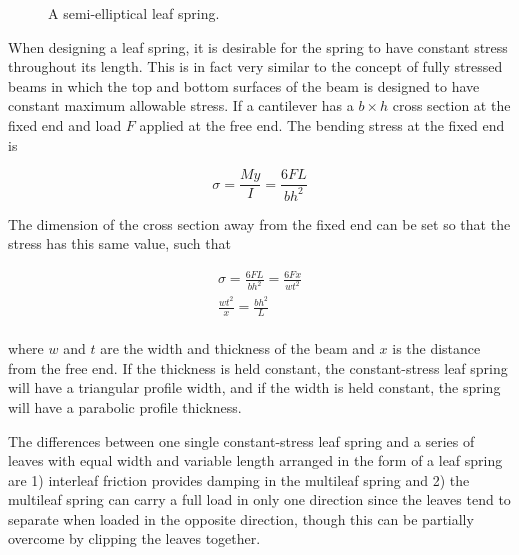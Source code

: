 \documentclass[a4paper,openany,nobib]{tufte-book}
\begin{document}
{{\begin{figure}[h]
  \centering
  \caption{A semi-elliptical leaf spring.}
  \label{fig: leaf springs}
\end{figure}

When designing a leaf spring, it is desirable for the spring to have
constant stress throughout its length. This is in fact very similar to
the concept of fully stressed beams in which the top and bottom surfaces
of the beam is designed to have constant maximum allowable stress. If a
cantilever has a \(b \times h\) cross section at the fixed end and load
\(F\) applied at the free end. The bending stress at the fixed end is

$$\sigma  = \frac{My}{I} = \frac{6FL}{bh^2}$$

The dimension of the cross section away from the fixed end can be set so
that the stress has this same value, such that

$$\begin{gathered}
    \sigma  = \frac{6FL}{bh^2} = \frac{6Fx}{wt^2} \\
    \frac{wt^2}{x} = \frac{bh^2}{L} \\ 
  \end{gathered}$$

where \(w\) and \(t\) are the width and thickness of the beam and \(x\) is the
distance from the free end. If the thickness is held constant, the
constant-stress leaf spring will have a triangular profile width, and if
the width is held constant, the spring will have a parabolic profile
thickness.

The differences between one single constant-stress leaf spring and a
series of leaves with equal width and variable length arranged in the
form of a leaf spring are 1) interleaf friction provides damping in the
multileaf spring and 2) the multileaf spring can carry a full load in
only one direction since the leaves tend to separate when loaded in the
opposite direction, though this can be partially overcome by clipping
the leaves together.

}}
\end{document}
